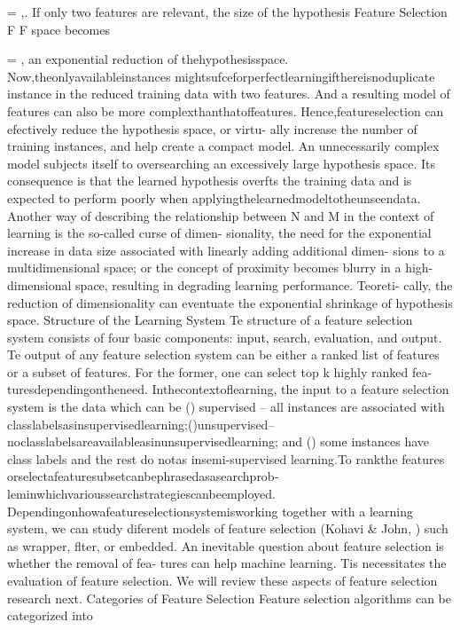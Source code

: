= ,. If
only two features are relevant, the size of the hypothesis
Feature Selection F 
F
space becomes  

= , an exponential reduction of
thehypothesisspace.
Now,theonlyavailableinstances
mightsufceforperfectlearningifthereisnoduplicate
instance in the reduced training data with two features.
And a resulting model of  features can also be more
complexthanthatoffeatures.
Hence,featureselection
can efectively reduce the hypothesis space, or virtu-
ally increase the number of training instances, and help
create a compact model.
An unnecessarily complex model subjects itself to
oversearching an excessively large hypothesis space. 
Its
consequence is that the learned hypothesis overfts the
training data and is expected to perform poorly when
applyingthelearnedmodeltotheunseendata.
Another
way of describing the relationship between N and M in
the context of learning is the so-called curse of dimen-
sionality, the need for the exponential increase in data
size associated with linearly adding additional dimen-
sions to a multidimensional space; or the concept of
proximity becomes blurry in a high-dimensional space,
resulting in degrading learning performance. 
Teoreti-
cally, the reduction of dimensionality can eventuate the
exponential shrinkage of hypothesis space.
Structure of the Learning System
Te structure of a feature selection system consists of
four basic components: input, search, evaluation, and
output. 
Te output of any feature selection system can
be either a ranked list of features or a subset of features.
For the former, one can select top k highly ranked fea-
turesdependingontheneed.
Inthecontextoflearning,
the input to a feature selection system is the data which
can be () supervised – all instances are associated with
classlabelsasinsupervisedlearning;()unsupervised–
noclasslabelsareavailableasinunsupervisedlearning;
and () some instances have class labels and the rest do
notas insemi-supervised learning.To rankthe features
orselectafeaturesubsetcanbephrasedasasearchprob-
leminwhichvarioussearchstrategiescanbeemployed.
Dependingonhowafeatureselectionsystemisworking
together with a learning system, we can study diferent
models of feature selection (Kohavi \& John, ) such
as wrapper, flter, or embedded. An inevitable question
about feature selection is whether the removal of fea-
tures can help machine learning. Tis necessitates the
evaluation of feature selection. We will review these
aspects of feature selection research next.
Categories of Feature Selection
Feature selection algorithms can be categorized into
